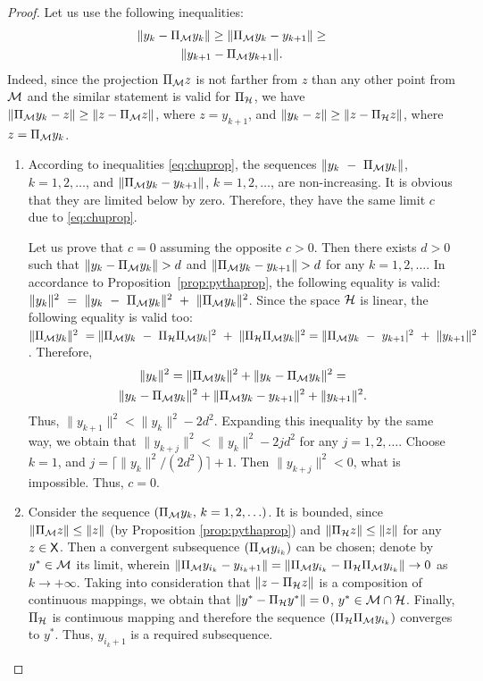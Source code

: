 \documentclass[sii]{ipart}
\begin{document}
\begin{proof}
	Let us use the following inequalities:
	\begin{multline}
	\label{eq:chuprop}
	\|y_k - \Pi_{\calM} y_k\| \ge \|\Pi_{\calM} y_k - y_{k + 1}\| \ge \\ \|y_{k+1} - \Pi_{\calM} y_{k + 1}\|.
	\end{multline}
Indeed, since the projection $\Pi_{\mathcal{M}} z$ is not farther from $z$ than any other point from $\mathcal{M}$ and the similar statement is valid for
$\Pi_{\mathcal{H}}$, we have $\|\Pi_{\mathcal{M}} y_k - z\| \ge \|z - \Pi_{\mathcal{M}} z\|$, where $z=y_{k+1}$, and $\|y_k - z\| \ge \|z - \Pi_{\mathcal{H}} z\|$, where $z=\Pi_{\mathcal{M}} y_k$.
	\begin{enumerate}
		\item According to inequalities \eqref{eq:chuprop}, the sequences $\|y_k~-~\Pi_{\mathcal{M}} y_k\|$, $k = 1, 2, \ldots$, and $\|\Pi_{\mathcal{M}} y_k - y_{k + 1}\|$, $k = 1, 2, \ldots$, are non-increasing. It is obvious that they are limited below by zero. Therefore, they have the same limit $c$ due to \eqref{eq:chuprop}.
		
		Let us prove that $c = 0$ assuming the opposite $c > 0$. Then there exists $d > 0$ such that $\|y_k - \Pi_{\mathcal{M}} y_k\| > d$ and $\|\Pi_{\mathcal{M}} y_k - y_{k + 1}\| > d$ for any $k = 1, 2, \ldots$. In accordance to Proposition~\ref{prop:pythaprop}, the following equality is valid: $\|y_k \|^2~=~\|y_k~-~\Pi_{\mathcal{M}} y_k\|^2~+~\|\Pi_{\mathcal{M}} y_k \|^2$. Since the space $\mathcal{H}$ is linear, the following equality is valid too:
		$\|\Pi_{\mathcal{M}} y_k \|^2~=\|\Pi_{\mathcal{M}} y_k~-~\Pi_{\mathcal{H}} \Pi_{\mathcal{M}} y_k|^2~+~\|\Pi_{\mathcal{H}} \Pi_{\mathcal{M}} y_k \|^2 = \|\Pi_{\mathcal{M}} y_k~-~y_{k+1}|^2~+~\|y_{k+1} \|^2$. Therefore,
		\begin{multline*}
		\|y_k\|^2 = \|\Pi_{\calM} y_k\|^2 + \|y_k - \Pi_{\calM} y_k\|^2 =\\ \|y_k - \Pi_{\calM} y_k\|^2 + \|\Pi_{\calM} y_k - y_{k + 1}\|^2 + \|y_{k + 1}\|^2.
		\end{multline*}
		Thus, $\|y_{k+1}\|^2 < \|y_k\|^2 - 2d^2$. Expanding this inequality by the same way, we obtain that $\|y_{k+j}\|^2 < \|y_k\|^2 - 2 j d^2$ for any $j = 1, 2, \ldots$. Choose $k = 1$, and $j = \lceil \|y_k\|^2 / (2d^2) \rceil + 1$. Then $\|y_{k+j}\|^2 < 0$, what is impossible. Thus, $c=0$.
		\item Consider the sequence $(\Pi_{\mathcal{M}} y_k,\, k = 1, 2, \ldots)$. It is bounded, since $\|\Pi_{\mathcal{M}} z\| \le \|z\|$ (by Proposition \ref{prop:pythaprop}) and $\|\Pi_{\mathcal{H}} z\| \le \|z\|$ for any $z \in \mathsf{X}$. Then a convergent subsequence $(\Pi_{\mathcal{M}} y_{i_k})$ can be chosen; denote by $y^*\in\mathcal{M}$ its limit, wherein $\|\Pi_{\mathcal{M}} y_{i_k} - y_{i_k + 1}\| = \|\Pi_{\mathcal{M}} y_{i_k} - \Pi_{\mathcal{H}} \Pi_{\mathcal{M}} y_{i_k}\| \to 0$ as $k \to + \infty$. Taking into consideration that $\|z - \Pi_{\mathcal{H}} z\|$ is a composition of continuous mappings, we obtain that $\|y^* - \Pi_{\mathcal{H}} y^*\| = 0$, $y^* \in \mathcal{M} \cap \mathcal{H}$. Finally, $\Pi_{\mathcal{H}}$ is continuous mapping and therefore the sequence $(\Pi_{\mathcal{H}} \Pi_{\mathcal{M}} y_{i_k})$ converges to $y^*$. Thus, $y_{i_k + 1}$ is a required subsequence.
	\end{enumerate}
\end{proof}
\end{document}

